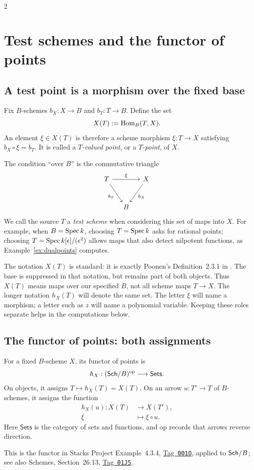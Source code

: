\documentclass[12pt]{memoir}
\newcommand{\BGtag}[1]{\href{https://stacks.math.columbia.edu/tag/#1}{Tag~\texttt{#1}}}
\begin{document}
\begin{multicols}{2}
\section{Test schemes and the functor of points}\label{sec:points}

\subsection{A test point is a morphism over the fixed base}
\begin{Def}\label{def:testpoints}
Fix $B$-schemes $b_X:X\to B$ and $b_T:T\to B$. Define the set
\[
 X(T):=\operatorname{Hom}_B(T,X).
\]
An element $\xi\in X(T)$ is therefore a scheme morphism
$\xi:T\to X$ satisfying $b_X\circ\xi=b_T$. It is called a
\emph{$T$-valued point}, or a \emph{$T$-point}, of $X$.
\end{Def}
The condition ``over $B$'' is the commutative triangle
\[
\begin{tikzcd}[column sep=small,row sep=large]
T \arrow[rr,"\xi"] \arrow[dr,"b_T"'] && X \arrow[dl,"b_X"]\\
&B&
\end{tikzcd}
\]
We call the source $T$ a \emph{test scheme} when considering this set
of maps into $X$. For example, when $B=\operatorname{Spec} k$, choosing $T=\operatorname{Spec} k$
asks for rational points; choosing $T=\operatorname{Spec} k[\epsilon]/(\epsilon^2)$
allows maps that
also detect nilpotent functions, as Example~\ref{ex:dualpoints} computes.

\begin{Rmk}
The notation $X(T)$ is standard: it is exactly Poonen's
Definition~2.3.1 in \cite[Section~2.3]{Poonen}. The base is suppressed
in that notation, but remains part of both objects. Thus $X(T)$ means
maps over our specified $B$, not all scheme maps $T\to X$.
The longer notation $h_X(T)$ will denote the same set. The letter
$\xi$ will name a morphism; a letter such as $z$ will name a polynomial
variable. Keeping these roles separate helps in the computations below.
\end{Rmk}

\subsection{The functor of points: both assignments}
\begin{Def}\label{def:pointfunctor}
For a fixed $B$-scheme $X$, its functor of points is
\[
 h_X:(\mathsf{Sch}/B)^{\mathrm{op}}\longrightarrow\mathsf{Sets}.
\]
On objects, it assigns $T\mapsto h_X(T)=X(T)$. On an arrow
$u:T'\to T$ of $B$-schemes, it assigns the function
\[
\begin{aligned}
 h_X(u):X(T)&\longrightarrow X(T'),\\
 \xi&\longmapsto\xi\circ u.
\end{aligned}
\]
Here $\mathsf{Sets}$ is the category of sets and functions, and
$\mathrm{op}$ records that arrows reverse direction.
\end{Def}
This is the functor in Stacks Project Example~4.3.4, \BGtag{001O},
applied to $\mathsf{Sch}/B$; see also Schemes, Section~26.13, \BGtag{01J5}.


\end{multicols}
\end{document}
